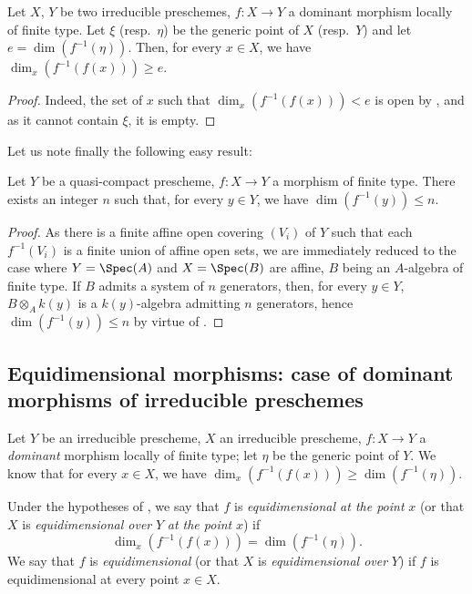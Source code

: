 \begin{corollary}[13.1.6]
\label{IV.13.1.6}
Let $X$, $Y$ be two irreducible preschemes, $f:X\to Y$ a dominant morphism locally of finite type.
Let $\xi$ (resp.\ $\eta$) be the generic point of $X$ (resp.\ $Y$) and let $e=\dim(f^{-1}(\eta))$.
Then, for every $x\in X$, we have $\dim_x(f^{-1}(f(x)))\geq e$.
\end{corollary}

\begin{proof}
Indeed, the set of $x$ such that $\dim_x(f^{-1}(f(x)))<e$ is open by , and as it cannot contain $\xi$, it is empty.
\end{proof}

Let us note finally the following easy result:

\begin{proposition}[13.1.7]
\label{IV.13.1.7}
Let $Y$ be a quasi-compact prescheme, $f:X\to Y$ a morphism of finite type.
There exists an integer $n$ such that, for every $y\in Y$, we have $\dim(f^{-1}(y))\leq n$.
\end{proposition}

\begin{proof}
As there is a finite affine open covering $(V_i)$ of $Y$ such that each $f^{-1}(V_i)$ is a finite union of affine open sets, we are immediately reduced to the case where $Y=\Spec(A)$ and $X=\Spec(B)$ are affine, $B$ being an $A$-algebra of finite type.
If $B$ admits a system of $n$ generators, then, for every $y\in Y$, $B\otimes_A k(y)$ is a $k(y)$-algebra admitting $n$ generators, hence $\dim(f^{-1}(y))\leq n$ by virtue of .
\end{proof}

\subsection{Equidimensional morphisms: case of dominant morphisms of irreducible preschemes}
\label{subsection:IV.13.2}

\begin{env}[13.2.1]
\label{IV.13.2.1}
Let $Y$ be an irreducible prescheme, $X$ an irreducible prescheme, $f:X\to Y$ a \emph{dominant} morphism locally of finite type; let $\eta$ be the generic point of $Y$.
We know  that for every $x\in X$, we have $\dim_x(f^{-1}(f(x)))\geq\dim(f^{-1}(\eta))$.
\end{env}

\begin{definition}[13.2.2]
\label{IV.13.2.2}
Under the hypotheses of , we say that $f$ is \emph{equidimensional at the point} $x$ (or that $X$ is \emph{equidimensional over} $Y$ \emph{at the point} $x$) if
\[
  \dim_x(f^{-1}(f(x)))=\dim(f^{-1}(\eta)).
\]
We say that $f$ is \emph{equidimensional} (or that $X$ is \emph{equidimensional over} $Y$) if $f$ is equidimensional at every point $x\in X$.
\end{definition}


